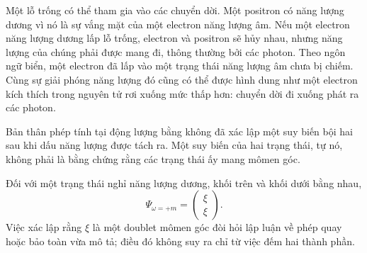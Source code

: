 \begin{classroomqa}
\end{classroomqa}

Một lỗ trống có thể tham gia vào các chuyển dời. Một positron có năng lượng dương vì nó là sự vắng mặt của một electron năng lượng âm. Nếu một electron năng lượng dương lấp lỗ trống, electron và positron sẽ hủy nhau, nhưng năng lượng của chúng phải được mang đi, thông thường bởi các photon. Theo ngôn ngữ biển, một electron đã lấp vào một trạng thái năng lượng âm chưa bị chiếm. Cùng sự giải phóng năng lượng đó cũng có thể được hình dung như một electron kích thích trong nguyên tử rơi xuống mức thấp hơn: chuyển dời đi xuống phát ra các photon.

\begin{classroomqa}
\end{classroomqa}

Bản thân phép tính tại động lượng bằng không đã xác lập một suy biến bội hai sau khi dấu năng lượng được tách ra. Một suy biến của hai trạng thái, tự nó, không phải là bằng chứng rằng các trạng thái ấy mang mômen góc.

\begin{classroomqa}
\end{classroomqa}

Đối với một trạng thái nghỉ năng lượng dương, khối trên và khối dưới bằng nhau,
\begin{equation}
\Psi_{\omega=+m}=
\begin{pmatrix}
\xi\\
\xi
\end{pmatrix}.
\end{equation}
Việc xác lập rằng \(\xi\) là một doublet mômen góc đòi hỏi lập luận về phép quay hoặc bảo toàn vừa mô tả; điều đó không suy ra chỉ từ việc đếm hai thành phần.


